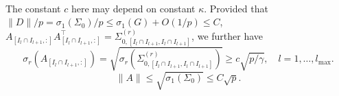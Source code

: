 \documentclass[11pt]{article}
\newcommand{\0}{{\mathbf{0}}}
\newcommand{\1}{{\mathbf{1}}}
\begin{document}
\begin{enumerate}[leftmargin=*]
\begin{equation}
\begin{split}
	\end{split}
	\end{equation}
	The constant $c$ here may depend on constant $\kappa$. Provided that $\|D\|/p = \sigma_1(\Sigma_0)/p \leq \sigma_1(G) + O(1/p) \leq C$, $A_{[I_l\cap I_{l+1}, :]}A_{[I_l\cap I_{l+1}, :]}^\top = \Sigma^{(r)}_{0, [I_l\cap I_{l+1}, I_l\cap I_{l+1}]}$, we further have
	\begin{equation}\label{ineq:sigma_rA_I_l-l+1}
	\sigma_r\left(A_{[I_l\cap I_{l+1}, :]}\right) = \sqrt{\sigma_r\left(\Sigma^{(r)}_{0, [I_l\cap I_{l+1}, I_l\cap I_{l+1}]}\right)} \geq c\sqrt{p/\gamma}, \quad l=1,\ldots, l_{\max}.
	\end{equation}
	\begin{equation}
	\|A\| \leq \sqrt{\sigma_1(\Sigma_0)} \leq C\sqrt{p}.
	\end{equation}

	


\end{enumerate}
\end{document}

